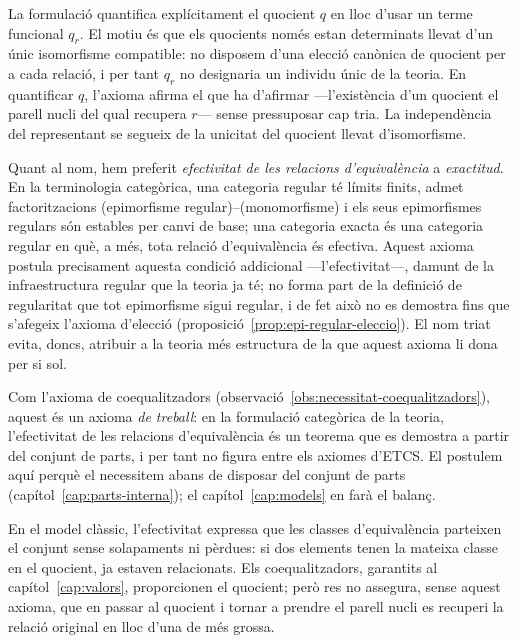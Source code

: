 \begin{observacio}\label{obs:exactitud-formulacio}
La formulació quantifica explícitament el quocient \(q\) en lloc d'usar un terme funcional \(q_r\). El motiu és que els quocients només estan determinats llevat d'un únic isomorfisme compatible: no disposem d'una elecció canònica de quocient per a cada relació, i per tant \(q_r\) no designaria un individu únic de la teoria. En quantificar \(q\), l'axioma afirma el que ha d'afirmar ---l'existència d'un quocient el parell nucli del qual recupera \(r\)--- sense pressuposar cap tria. La independència del representant se segueix de la unicitat del quocient llevat d'isomorfisme.

Quant al nom, hem preferit \emph{efectivitat de les relacions d'equivalència} a \emph{exactitud}. En la terminologia categòrica, una categoria regular té límits finits, admet factoritzacions (epimorfisme regular)--(monomorfisme) i els seus epimorfismes regulars són estables per canvi de base; una categoria exacta és una categoria regular en què, a més, tota relació d'equivalència és efectiva. Aquest axioma postula precisament aquesta condició addicional ---l'efectivitat---, damunt de la infraestructura regular que la teoria ja té; no forma part de la definició de regularitat que tot epimorfisme sigui regular, i de fet això no es demostra fins que s'afegeix l'axioma d'elecció (proposició~\ref{prop:epi-regular-eleccio}). El nom triat evita, doncs, atribuir a la teoria més estructura de la que aquest axioma li dona per si sol.

Com l'axioma de coequalitzadors (observació~\ref{obs:necessitat-coequalitzadors}), aquest és un axioma \emph{de treball}: en la formulació categòrica de la teoria, l'efectivitat de les relacions d'equivalència és un teorema que es demostra a partir del conjunt de parts, i per tant no figura entre els axiomes d'ETCS. El postulem aquí perquè el necessitem abans de disposar del conjunt de parts (capítol~\ref{cap:parts-interna}); el capítol~\ref{cap:models} en farà el balanç.
\end{observacio}

\begin{observacio}\label{obs:exactitud-classica}
En el model clàssic, l'efectivitat expressa que les classes d'equivalència parteixen el conjunt sense solapaments ni pèrdues: si dos elements tenen la mateixa classe en el quocient, ja estaven relacionats. Els coequalitzadors, garantits al capítol~\ref{cap:valors}, proporcionen el quocient; però res no assegura, sense aquest axioma, que en passar al quocient i tornar a prendre el parell nucli es recuperi la relació original en lloc d'una de més grossa.
\end{observacio}

